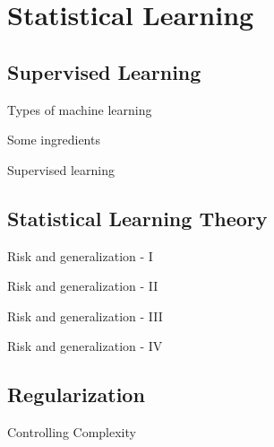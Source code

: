 
\section{Statistical Learning}
\subsection{Supervised Learning}
\begin{frame}[t]{Types of machine learning}

\end{frame}
\begin{frame}[t]{Some ingredients}

\end{frame}

\begin{frame}[t]{Supervised learning}

\end{frame}
\subsection{Statistical Learning Theory}
\begin{frame}[t]{Risk and generalization - I}

\end{frame}
\begin{frame}[t]{Risk and generalization - II}

\end{frame}
\begin{frame}[t]{Risk and generalization - III}

\end{frame}
\begin{frame}[t]{Risk and generalization - IV}

\end{frame}
\subsection{Regularization}
\begin{frame}{Controlling Complexity}

\end{frame}
